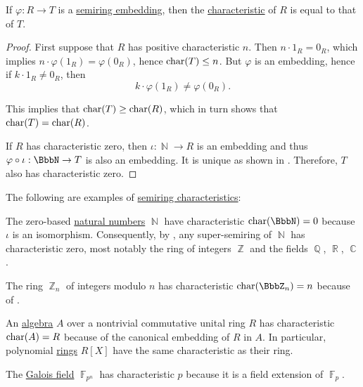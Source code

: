 \begin{proposition}\label{thm:semiring_embedding_preserves_characterstic}
  If \( \varphi: R \to T \) is a \hyperref[def:semiring/homomorphism]{semiring embedding}, then the \hyperref[def:semiring_characteristic]{characteristic} of \( R \) is equal to that of \( T \).
\end{proposition}
\begin{proof}
  First suppose that \( R \) has positive characteristic \( n \). Then \( n \cdot 1_R = 0_R \), which implies \( n \cdot \varphi(1_R) = \varphi(0_R) \), hence \( \operatorname{char}(T) \leq n \). But \( \varphi \) is an embedding, hence if \( k \cdot 1_R \neq 0_R \), then
  \begin{equation*}
    k \cdot \varphi(1_R) \neq \varphi(0_R).
  \end{equation*}

  This implies that \( \operatorname{char}(T) \geq \operatorname{char}(R) \), which in turn shows that \( \operatorname{char}(T) = \operatorname{char}(R) \).

  If \( R \) has characteristic zero, then \( \iota: \BbbN \to R \) is an embedding and thus \( \varphi \bincirc \iota: \BbbN \to T \) is also an embedding. It is unique as shown in . Therefore, \( T \) also has characteristic zero.
\end{proof}

\begin{example}\label{ex:semiring_characteristic}
  The following are examples of \hyperref[def:semiring_characteristic]{semiring characteristics}:

  \begin{thmenum}
     The zero-based \hyperref[def:set_of_natural_numbers]{natural numbers} \( \BbbN \) have characteristic \( \op{char}(\BbbN) = 0 \) because \( \iota \) is an isomorphism. Consequently, by , any super-semiring of \( \BbbN \) has characteristic zero, most notably the ring of integers \( \BbbZ \) and the fields \( \BbbQ \), \( \BbbR \), \( \BbbC \).

     The ring \hyperref[def:ring_of_integers_modulo]{\( \BbbZ_n \)} of integers modulo \( n \) has characteristic \( \op{char}(\BbbZ_n) = n \) because of .

     An \hyperref[def:algebra_over_ring]{algebra} \( A \) over a nontrivial commutative unital ring \( R \) has characteristic \( \operatorname{char}(A) = R \) because of the canonical embedding of \( R \) in \( A \). In particular, polynomial \hyperref[def:algebra_of_polynomials]{rings} \( R[X] \) have the same characteristic as their ring.

     The \hyperref[thm:galois_field_existence]{Galois field} \( \BbbF_{p^n} \) has characteristic \( p \) because it is a field extension of \( \BbbF_p \).
  \end{thmenum}
\end{example}

